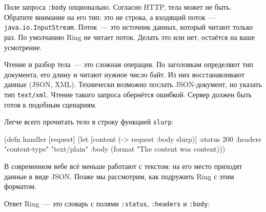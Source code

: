 
Поле запроса \verb|:body| опционально. Согласно HTTP, тела может не
быть. Обратите внимание на его тип: это не строка, а входящий поток~---
\verb|java.io.InputStream|. Поток~--- это источник данных, который читают только
раз. По умолчанию Ring не читает поток. Делать это или нет, остаётся на ваше
усмотрение.


Чтение и разбор тела~--- это сложная операция. По заголовкам определяют тип
документа, его длину и читают нужное число байт. Из них восстанавливают данные
(JSON, XML). Технически возможно послать JSON-документ, но указать тип
\verb|text/xml|. Чтение такого запроса обернётся ошибкой. Сервер должен быть
готов к подобным сценариям.

Легче всего прочитать тело в строку функцией \verb|slurp|:

\ifnarrow

\begin{english}
  \begin{clojure}
(defn handler [request]
 (let [content (-> request :body slurp)]
  {:status 200
   :headers {"content-type" "text/plain"}
   :body (format "The content was %
                 content)}))
  \end{clojure}
\end{english}

\else

\begin{english}
\end{english}

\fi

В современном вебе всё меньше работают с текстом: на его место приходят данные в
виде JSON. Позже мы рассмотрим, как подружить Ring с этим форматом.


Ответ Ring~--- это словарь с полями \verb|:status|, \verb|:headers| и
\verb|:body|:

